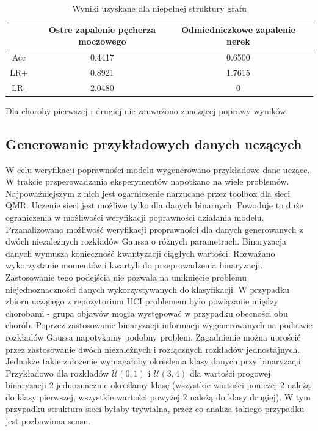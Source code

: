 \documentclass[12pt]{article}
\begin{document}
\begin{table}[H]
\caption{Wyniki uzyskane dla niepełnej struktury grafu}
\label{results not full}
\centering
\begin{tabular}{|c|c|c|c|}
  \hline 
   & Ostre zapalenie pęcherza moczowego & Odmiedniczkowe zapalenie nerek \\
  \hline
  Acc & 0.4417 & 0.6500 \\
  \hline
  LR+ & 0.8921 & 1.7615 \\
  \hline
  LR- & 2.0480 & 0 \\
  \hline
\end{tabular}
\end{table}

Dla choroby pierwszej i drugiej nie zauważono znaczącej poprawy wyników.

\subsection{Generowanie przykładowych danych uczących}

W celu weryfikacji poprawności modelu wygenerowano przykładowe dane uczące. W trakcie przperowadzania eksperymentów napotkano na wiele problemów. Najpoważniejszym z nich jest ogarniczenie narzucane przez toolbox dla sieci QMR. Uczenie sieci jest możliwe tylko dla danych binarnych. Powoduje to duże ograniczenia w możliwości weryfikacji poprawności działania modelu. Przanalizowano możliwość weryfikacji proprawności dla danych generowanych z dwóch niezależnych rozkładów Gaussa o różnych parametrach. Binaryzacja danych wymusza konieczność kwantyzacji ciągłych wartości. Rozważano wykorzystanie momentów i kwartyli do przeprowadzenia binaryzacji. Zastosowanie tego podejścia nie pozwala na uniknięcie problemu niejednoznaczności danych wykorzystywanych do klasyfikacji. W przypadku zbioru uczącego z repozytorium UCI problemem było powiązanie między chorobami - grupa objawów mogła występować w przypadku obecności obu chorób. Poprzez zastosowanie binaryzacji informacji wygenerowanych na podstwie rozkładów Gaussa napotykamy podobny problem. Zagadnienie można uprościć przez zastosowanie dwóch niezależnych i rozłącznych rozkładów jednostajnych. Jednakże takie założenie wymagałoby określenia klasy danych przy binaryzacji. Przykładowo dla rozkładów $\mathcal{U}(0,1)$ i $\mathcal{U}(3,4)$ dla wartości progowej binaryzacji $2$ jednoznacznie określamy klasę (wszystkie wartości ponieżej $2$ należą do klasy pierwszej, wszystkie wartości powyżej $2$ należą do klasy drugiej). W tym przypadku struktura sieci byłaby trywialna, przez co analiza takiego przypadku jest pozbawiona sensu.
\end{document}

